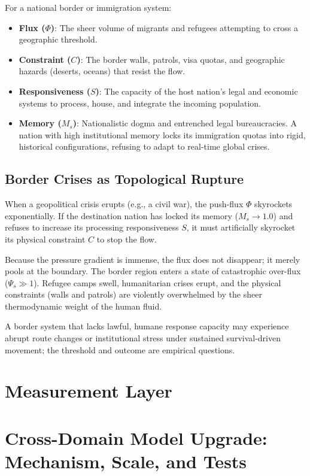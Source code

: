 \documentclass[11pt,a4paper]{article}
\begin{document}
For a national border or immigration system:
\begin{itemize}
    \item \textbf{Flux ($\Phi$)}: The sheer volume of migrants and refugees attempting to cross a geographic threshold.
    \item \textbf{Constraint ($C$)}: The border walls, patrols, visa quotas, and geographic hazards (deserts, oceans) that resist the flow.
    \item \textbf{Responsiveness ($S$)}: The capacity of the host nation's legal and economic systems to process, house, and integrate the incoming population.
    \item \textbf{Memory ($M_s$)}: Nationalistic dogma and entrenched legal bureaucracies. A nation with high institutional memory locks its immigration quotas into rigid, historical configurations, refusing to adapt to real-time global crises.
\end{itemize}

\subsection{Border Crises as Topological Rupture}
When a geopolitical crisis erupts (e.g., a civil war), the push-flux $\Phi$ skyrockets exponentially. If the destination nation has locked its memory ($M_s \to 1.0$) and refuses to increase its processing responsiveness $S$, it must artificially skyrocket its physical constraint $C$ to stop the flow.

Because the pressure gradient is immense, the flux does not disappear; it merely pools at the boundary. The border region enters a state of catastrophic over-flux ($\Psi_s \gg 1$). Refugee camps swell, humanitarian crises erupt, and the physical constraints (walls and patrols) are violently overwhelmed by the sheer thermodynamic weight of the human fluid.

A border system that lacks lawful, humane response capacity may experience abrupt route changes or institutional stress under sustained survival-driven movement; the threshold and outcome are empirical questions.



\section{Measurement Layer}

\section{Cross-Domain Model Upgrade: Mechanism, Scale, and Tests}
\end{document}
